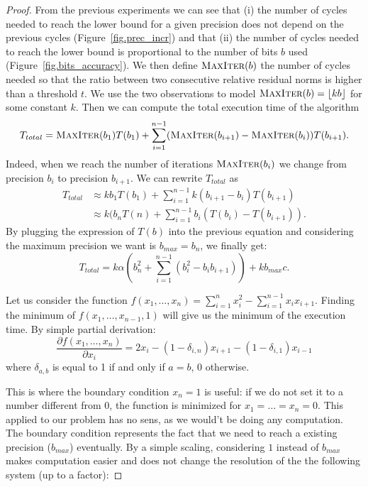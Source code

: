 \documentclass[a4paper,10pt]{article}
\begin{document}
   \begin{proof}
   From the previous experiments we can see that (i) the number of cycles needed to reach the lower bound for a given precision does not depend on the previous cycles (Figure~\ref{fig.prec_incr}) and that (ii) the number of cycles
   needed to reach the lower bound is proportional to the number of bits $b$ used (Figure~\ref{fig.bits_accuracy}). We then define $\textsc{MaxIter}(b)$ the number of cycles needed so that the ratio between two consecutive
   relative residual norms is higher than a threshold $t$. We use the two observations to model $\textsc{MaxIter}(b) = \lfloor kb \rfloor$ for some constant $k$.
   Then we can compute the total execution time of the algorithm \[T_{total} = \textsc{MaxIter}(b_1)T(b_1) + \sum\limits_{i=1}^{n-1} (\textsc{MaxIter}(b_{i+1})-\textsc{MaxIter}(b_i))T(b_{i+1}). \]
   Indeed, when we reach the number of iterations $\textsc{MaxIter}(b_i)$ we change from precision $b_i$ to precision $b_{i+1}$.
   We can rewrite $T_{total}$ as
   \begin{align*}
    T_{total} &\approx k b_{1} T(b_1) + \sum\limits_{i=1}^{n-1} k(b_{i+1}-b_{i})T(b_{i+1})\\
	    & \approx k ( b_{n}T(n) + \sum\limits_{i=1}^{n-1} b_i ( T(b_i) - T(b_{i+1})).
   \end{align*}
   By plugging the expression of $T(b)$ into the previous equation and considering the maximum precision we want is $b_{max}=b_n$, we finally get:
   \begin{equation}
    T_{total}  = k\alpha\left(b_n^2 + \sum\limits_{i=1}^{n-1} (b_i^2 - b_i b_{i+1})\right) + kb_{max}c.
   \end{equation}
   
   Let us consider the function $f(x_1,\dots,x_n) = \sum\limits_{i=1}^n x_i^2 - \sum\limits_{i=1}^{n-1} x_ix_{i+1}$. Finding the minimum of $f(x_1,\dots,x_{n-1},1)$ will give
   us the minimum of the execution time.
   By simple partial derivation:
   \[ \frac{\partial f(x_1,\dots,x_n)}{\partial x_i} = 2x_i - (1-\delta_{i,n})x_{i+1} - (1-\delta_{i,1})x_{i-1} \]
   where $\delta_{a,b} $ is equal to 1 if and only if $a=b$, 0 otherwise.
   
   This is where the boundary condition $x_n = 1$ is useful: if we do not set it to a number different from 0, the function is minimized for $x_1=\dots=x_n=0$. This applied to our problem
   has no sens, as we would't be doing any computation. The boundary condition represents the fact that we need to reach a existing precision ($b_{max}$) eventually. By a simple scaling,
   considering $1$ instead of $b_{max}$ makes computation easier and does not change the resolution of the the following system (up to a factor):
   

\end{proof}
\end{document}
